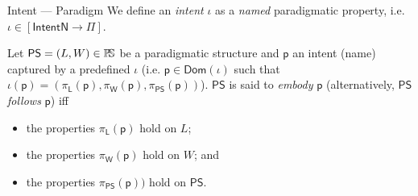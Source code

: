 \begin{Definition}{\label{def:Paradigm}Intent --- Paradigm}
   We define an \emph{intent} $\iota$ as a \emph{named} paradigmatic property, 
i.e. $\iota \in [\mathsf{IntentN} \to \Pi]$.

   Let $\mathsf{PS} = (L, W)\in\mathbb{P}\!\mathbb{S}$ be a paradigmatic structure and 
$\mathsf{p}$ an intent (name) captured by a predefined $\iota$ (i.e. 
$\mathsf{p}\in \mathsf{Dom}(\iota)$ such that 
$\iota(\mathsf{p}) = (\pi_{\mathsf{L}}(\mathsf{p}), 
                     \pi_{\mathsf{W}}(\mathsf{p}), 
                     \pi_{\mathsf{PS}}(\mathsf{p}))$). 
$\mathsf{PS}$ is said to \emph{embody} $\mathsf{p}$ (alternatively, 
$\mathsf{PS}$ \emph{follows} $\mathsf{p}$) iff 
\begin{itemize}
   \item the properties $\pi_{\mathsf{L}}(\mathsf{p})$ hold on $L$;
   \item the properties $\pi_{\mathsf{W}}(\mathsf{p})$ hold on $W$; and
   \item the properties $ \pi_{\mathsf{PS}}(\mathsf{p}))$ hold on $\mathsf{PS}$.
\end{itemize}
\end{Definition}

\begin{Example}
\end{Example}

